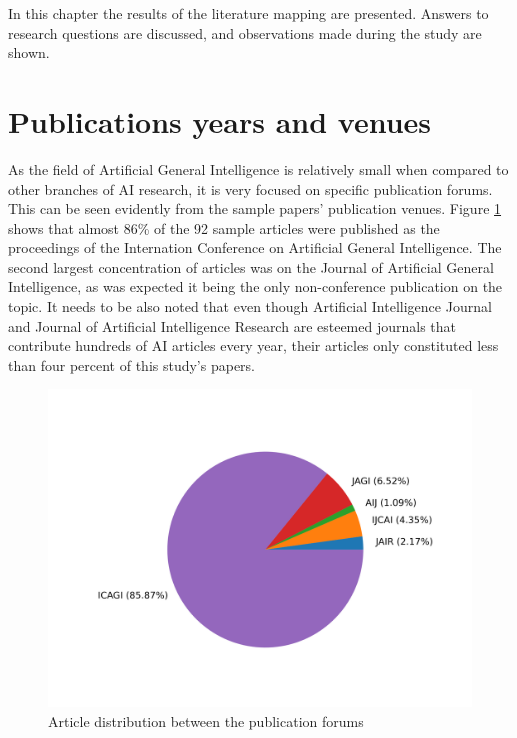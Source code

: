 \documentclass[utf8,english]{gradu3}
\begin{document}
 In this chapter the results of the literature mapping are presented. Answers to
 research questions are discussed, and observations made during the study are
 shown. 

 \section{Publications years and venues}

 As the field of Artificial General Intelligence is relatively small when
 compared to other branches of AI research, it is very focused on specific
 publication forums. This can be seen evidently from the sample papers'
 publication venues. Figure \ref*{fig:forumpie} shows that almost 86\% of the 92
 sample articles were published as the proceedings of the Internation Conference
 on Artificial General Intelligence. The second largest concentration of
 articles was on the Journal of Artificial General Intelligence, as was expected
 it being the only non-conference publication on the topic. It needs to be also
 noted that even though Artificial Intelligence Journal and Journal of
 Artificial Intelligence Research are esteemed journals that contribute hundreds
 of AI articles every year, their articles only constituted less than four
 percent of this study's papers. 


 \begin{figure}[H]
  \centering
  \includegraphics[scale=0.70]{material/data/forum_pie.png}
  \caption{Article distribution between the publication forums}
  \label{fig:forumpie}
\end{figure}
\end{document}
